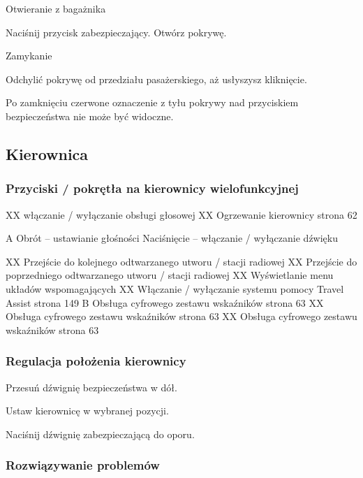 Otwieranie z bagażnika
\begin{itemizeArrow}
	\itemArrow Naciśnij przycisk zabezpieczający.
	\itemArrow Otwórz pokrywę.
\end{itemizeArrow}

Zamykanie
\begin{itemizeArrow}
	\itemArrow Odchylić pokrywę od przedziału pasażerskiego, aż usłyszysz kliknięcie.
\end{itemizeArrow}
Po zamknięciu czerwone oznaczenie z tyłu pokrywy nad przyciskiem bezpieczeństwa nie może być widoczne.

\subsection{Kierownica}

\subsubsection{Przyciski / pokrętła na kierownicy wielofunkcyjnej}


XX włączanie / wyłączanie obsługi głosowej
XX Ogrzewanie kierownicy \guillemotright strona 62

A Obrót – ustawianie głośności
Naciśnięcie – włączanie / wyłączanie dźwięku

XX Przejście do kolejnego odtwarzanego utworu / stacji radiowej
XX Przejście do poprzedniego odtwarzanego utworu / stacji radiowej
XX Wyświetlanie menu układów wspomagających
XX Włączanie / wyłączanie systemu pomocy Travel Assist \guillemotright strona 149
B Obsługa cyfrowego zestawu wskaźników \guillemotright strona 63
XX Obsługa cyfrowego zestawu wskaźników \guillemotright strona 63
XX Obsługa cyfrowego zestawu wskaźników \guillemotright strona 63


\subsubsection{Regulacja położenia kierownicy}

Przesuń dźwignię bezpieczeństwa w dół.

Ustaw kierownicę w wybranej pozycji.

Naciśnij dźwignię zabezpieczającą do oporu.

\subsubsection{Rozwiązywanie problemów}

